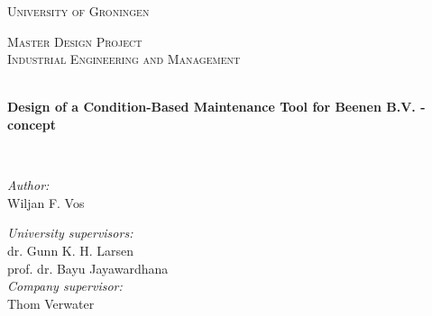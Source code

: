 \documentclass[
11pt, %
english, %
singlespacing, %
headsepline, %
]{MastersDoctoralThesis} %
\author{Wiljan Vos} %
\begin{document}
\frontmatter %

\pagestyle{plain} %


\begin{titlepage}
\begin{center}

\vspace*{.06\textheight}
{\scshape\LARGE University of Groningen\par}\vspace{1.5cm} %
\textsc{\Large Master Design Project}\\[0.5cm] %
\textsc{\large Industrial Engineering and Management}\\[0.5cm]

\HRule \\[0.4cm] %
{\huge \bfseries Design of a Condition-Based Maintenance Tool for Beenen B.V. - concept\par}\vspace{0.4cm} %
\HRule \\[1.5cm] %
 
\begin{minipage}[t]{0.4\textwidth}
\begin{flushleft} \large
\emph{Author:}\\
{Wiljan F. Vos} %
\end{flushleft}
\end{minipage}
\begin{minipage}[t]{0.4\textwidth}
\begin{flushright} \large
\emph{University supervisors:} \\
{dr. Gunn K. H. Larsen} \\%
{prof. dr. Bayu Jayawardhana} \\ [0.5cm]
\emph{Company supervisor:} \\
{Thom Verwater} \\
\end{flushright}
\end{minipage}\\[1cm]


\end{center}
\end{titlepage}
\end{document}

